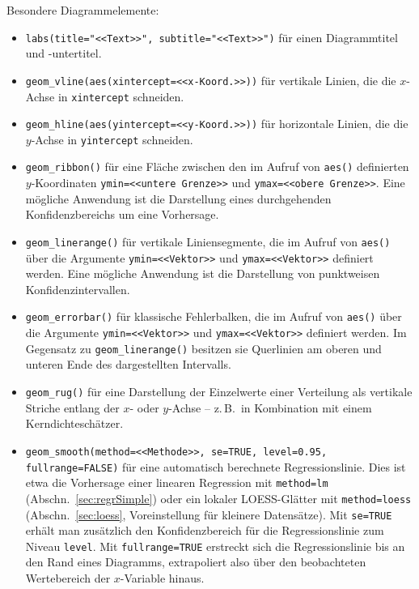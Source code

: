 Besondere Diagrammelemente:
\begin{itemize}
\item {} \lstinline!labs(title="<<Text>>", subtitle="<<Text>>")! für einen Diagrammtitel und -untertitel.
\item {} \lstinline!geom_vline(aes(xintercept=<<x-Koord.>>))! für vertikale Linien, die die $x$-Achse in \lstinline!xintercept! schneiden.
\item {} \lstinline!geom_hline(aes(yintercept=<<y-Koord.>>))! für horizontale Linien, die die $y$-Achse in \lstinline!yintercept! schneiden.
\item {} \lstinline!geom_ribbon()! für eine Fläche zwischen den im Aufruf von \lstinline!aes()! definierten $y$-Koordinaten \lstinline!ymin=<<untere Grenze>>! und \lstinline!ymax=<<obere Grenze>>!. Eine mögliche Anwendung ist die Darstellung eines durchgehenden Konfidenzbereichs um eine Vorhersage.
\item {} \lstinline!geom_linerange()! für vertikale Liniensegmente, die im Aufruf von \lstinline!aes()! über die Argumente \lstinline!ymin=<<Vektor>>! und \lstinline!ymax=<<Vektor>>! definiert werden. Eine mögliche Anwendung ist die Darstellung von punktweisen Konfidenzintervallen.
\item {} \lstinline!geom_errorbar()! für klassische Fehlerbalken, die im Aufruf von \lstinline!aes()! über die Argumente \lstinline!ymin=<<Vektor>>! und \lstinline!ymax=<<Vektor>>! definiert werden. Im Gegensatz zu \lstinline!geom_linerange()! besitzen sie Querlinien am oberen und unteren Ende des dargestellten Intervalls.
\item {} \lstinline!geom_rug()! für eine Darstellung der Einzelwerte einer Verteilung als vertikale Striche entlang der $x$- oder $y$-Achse -- z.\,B.\ in Kombination mit einem Kerndichteschätzer.
\item {} \lstinline!geom_smooth(method=<<Methode>>, se=TRUE, level=0.95, fullrange=FALSE)! für eine automatisch berechnete Regressionslinie. Dies ist etwa die Vorhersage einer linearen Regression mit \lstinline!method=lm! (Abschn.\ \ref{sec:regrSimple}) oder ein lokaler LOESS-Glätter mit \lstinline!method=loess! (Abschn.\ \ref{sec:loess}, Voreinstellung für kleinere Datensätze). Mit \lstinline!se=TRUE! erhält man zusätzlich den Konfidenzbereich für die Regressionslinie zum Niveau \lstinline!level!. Mit \lstinline!fullrange=TRUE! erstreckt sich die Regressionslinie bis an den Rand eines Diagramms, extrapoliert also über den beobachteten Wertebereich der $x$-Variable hinaus.

\end{itemize}
